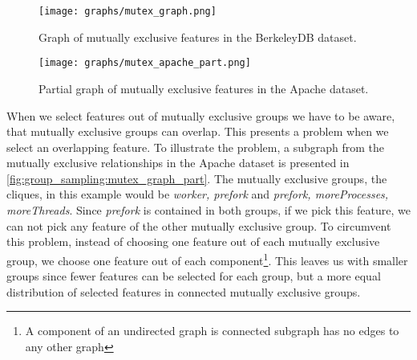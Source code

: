 \documentclass[../../thesis.tex]{subfiles}
\begin{document}
\begin{figure}[htp]
    \begin{center}
        \texttt{[image: graphs/mutex\_graph.png]}
    \end{center}

    \caption[Graph of mutually exclusive features - BerkeleyDB]{
        Graph of mutually exclusive features in the BerkeleyDB dataset.
    }\label{fig:group_sampling:mutex_graph}
\end{figure}



\begin{figure}[htp]
    \begin{center}
        \texttt{[image: graphs/mutex\_apache\_part.png]}
    \end{center}
    \caption[Graph of mutually exclusive features - Apache]{
        Partial graph of mutually exclusive features in the Apache dataset.
    }\label{fig:group_sampling:mutex_graph_part}
\end{figure}

When we select features out of mutually exclusive groups we have to be aware, that mutually exclusive groups
can overlap. This presents a problem when we select an overlapping feature. To illustrate the problem,
a subgraph from the mutually exclusive relationships in the Apache dataset is presented in \autoref{fig:group_sampling:mutex_graph_part}.
The mutually exclusive groups, the cliques, in this example would be
\textit{worker, prefork} and \textit{prefork, moreProcesses, moreThreads}. Since \textit{prefork} is contained
in both groups, if we pick this feature, we can not pick any feature of the other mutually exclusive group.
To circumvent this problem, instead of choosing one feature out of each mutually exclusive group,
we choose one feature out of each component\footnote{A component of an undirected graph is connected subgraph has no edges to any other graph}.
This leaves us with smaller groups since fewer features can be selected for each group,
but a more equal distribution of selected features
in connected mutually exclusive groups.
\end{document}
